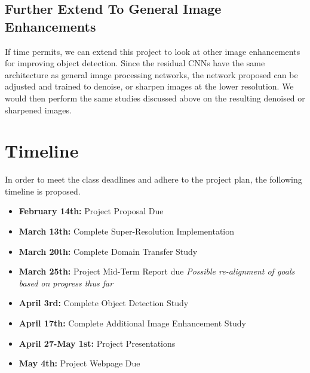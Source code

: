 \documentclass{article}
\begin{document}
\subsection{Further Extend To General Image Enhancements}
If time permits, we can extend this project to look at other image enhancements for improving object detection. Since the residual CNNs have the same architecture as general image processing networks, the network proposed can be adjusted and trained to denoise, or sharpen images at the lower resolution. We would then perform the same studies discussed above on the resulting denoised or sharpened images.

\section{Timeline}
In order to meet the class deadlines and adhere to the project plan, the following timeline is proposed.

\begin{itemize}
    \item \textbf{February 14th:} Project Proposal Due 
    \item \textbf{March 13th:} Complete Super-Resolution Implementation
    \item \textbf{March 20th:} Complete Domain Transfer Study
    \item \textbf{March 25th:} Project Mid-Term Report due \textit{Possible re-alignment of goals based on progress thus far}
    \item \textbf{April 3rd:} Complete Object Detection Study
    \item \textbf{April 17th:} Complete Additional Image Enhancement Study
    \item \textbf{April 27-May 1st:} Project Presentations
    \item \textbf{May 4th:} Project Webpage Due
\end{itemize}


\printbibliography
\end{document}
